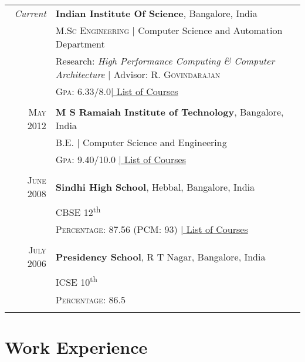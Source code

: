 \documentclass[a4paper,10pt]{article} %
\begin{document}
\begin{tabular}{rl}	
\emph{Current} & \textbf{Indian Institute Of Science}, Bangalore, India\\
& \textsc{M.Sc Engineering} | Computer Science and Automation Department\\
& Research: \small\emph{High Performance Computing \& Computer Architecture} | Advisor: R. \textsc{Govindarajan}\\
&\normalsize \textsc{Gpa}: 6.33/8.0\hyperlink{iisc}{\hfill | \footnotesize List of Courses}\\
&\\


\textsc{May} 2012 & \textbf{M S Ramaiah Institute of Technology}, Bangalore, India\\
& \textsc{B.E.} | Computer Science and Engineering \\
&\normalsize \textsc{Gpa}: 9.40/10.0 \hyperlink{msrit}{\hfill| \footnotesize List of Courses}\\
&\\


\textsc{June} 2008 & \textbf{Sindhi High School}, Hebbal, Bangalore, India\\
& \textsc{CBSE 12}\textsuperscript{th} \\
&\normalsize \textsc{Percentage}: 87.56 (PCM: 93) \hyperlink{hs}{\hfill| \footnotesize List of Courses}\\
&\\


\textsc{July} 2006 & \textbf{Presidency School}, R T Nagar, Bangalore, India\\
& \textsc{ICSE 10}\textsuperscript{th} \\
&\normalsize \textsc{Percentage}: 86.5 \\
&\\
\end{tabular}


\section{Work Experience}
\end{document}
